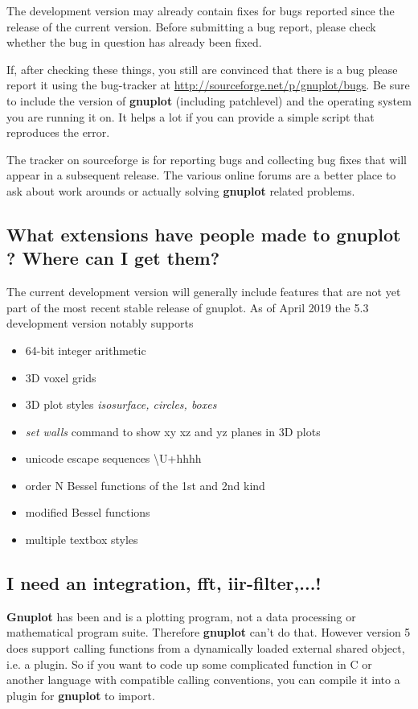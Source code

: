 \documentclass[a4paper,11pt]{article}
\def\http#1{{\small\href{http://#1}{\url{http://#1}}}}
\newcommand{\http}[1]%
            {\htmladdnormallink{\latex{\url{http://#1}}%
                    \html{\textit{http://#1}}}%
                {http://#1}%
            }
\newcommand{\gnuplot}{\textbf{gnuplot }}
\newcommand{\Gnuplot}{\textbf{Gnuplot }}
\begin{document}
The development version may already contain fixes for bugs reported
since the release of the current version.
Before submitting a bug report, please check whether the bug in question
has already been fixed.

If, after checking these things, you still are convinced that there is a
bug please report it using the bug-tracker at
\http{sourceforge.net/p/gnuplot/bugs}.
Be sure to include the version of \gnuplot (including patchlevel) and
the operating system you are running it on.
It helps a lot if you can provide a simple script that reproduces the error.

The tracker on sourceforge is for reporting bugs and collecting bug fixes
that will appear in a subsequent release.
The various online forums are a better place to ask about
work arounds or actually solving \gnuplot related problems.

\subsection{What extensions have people made to \gnuplot? Where can I get them?}

The current development version will generally include features that are
not yet part of the most recent stable release of gnuplot.
As of April 2019 the 5.3 development version notably supports
\begin{itemize}{}{}
\setlength\itemsep{-4pt}
\item 64-bit integer arithmetic
\item 3D voxel grids
\item 3D plot styles {\em isosurface, circles, boxes}
\item {\em set walls} command to show xy xz and yz planes in 3D plots
\item unicode escape sequences {\textbackslash}U+hhhh
\item order N Bessel functions of the 1st and 2nd kind
\item modified Bessel functions
\item multiple textbox styles
\end{itemize}

\subsection{I need an integration, fft, iir-filter,...!}

\Gnuplot{} has been and is a plotting program, not a data
processing or mathematical program suite. Therefore \gnuplot
can't do that.
However version 5 does support calling functions from a dynamically loaded
external shared object, i.e. a plugin.  So if you want to code up some complicated
function in C or another language with compatible calling conventions,
you can compile it into a plugin for \gnuplot to import.
\end{document}
